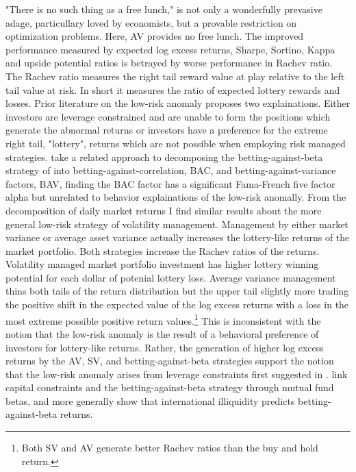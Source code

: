 "There is no such thing as a free lunch," is not only a wonderfully prevasive adage, particullary loved by economists, but a provable restriction on optimization problems.\citep{wolpert_no_1997} Here, AV provides no free lunch. The improved performance measured by expected log excess returns, Sharpe, Sortino, Kappa and upside potential ratios is betrayed by worse performance in Rachev ratio. The Rachev ratio measures the right tail reward value at play relative to the left tail value at risk. In short it measures the ratio of expected lottery rewards and losses. 
Prior literature on the low-risk anomaly proposes two explainations. Either investors are leverage constrained and are unable to form the positions which generate the abnormal returns or investors have a preference for the extreme right tail, "lottery", returns which are not possible when employing risk managed strategies. \citet{asness_betting_2018} take a related approach to decomposing the betting-against-beta strategy of \citet{frazzini_betting_2014} into betting-against-correlation, BAC, and betting-against-variance factors, BAV, finding the BAC factor has a significant Fama-French five factor alpha but unrelated to behavior explainations of the low-risk anomally.\citep{fama_dissecting_2016} From the decomposition of daily market returns I find similar results about the more general low-risk strategy of volatility management. Management by either market variance or average asset variance actually increases the lottery-like returns of the market portfolio. Both strategies increase the Rachev ratios of the returns.
Volatility managed market portfolio investment has higher lottery winning potential for each dollar of potenial lottery loss. Average variance management thins both tails of the return distribution but the upper tail slightly more trading the positive shift in the expected value of the log excess returns with a loss in the most extreme possible positive return values.\footnote{Both SV and AV generate better Rachev ratios than the buy and hold return.} This is inconsistent with the notion that the low-risk anomaly is the result of a behavioral preference of investors for lottery-like returns.\citep{barberis_stocks_2008,brunnermeier_optimal_2007} Rather, the generation of higher log excess returns by the AV, SV, and betting-against-beta strategies support the notion that the low-risk anomaly arises from leverage constraints first suggested in \citet{jensen1972capital}. \citet{boguth_leverage_2018} link capital constraints and the betting-against-beta strategy through mutual fund betas, and more generally \citet{malkhozov_international_2017} show that international illiquidity predicts betting-against-beta returns. 

